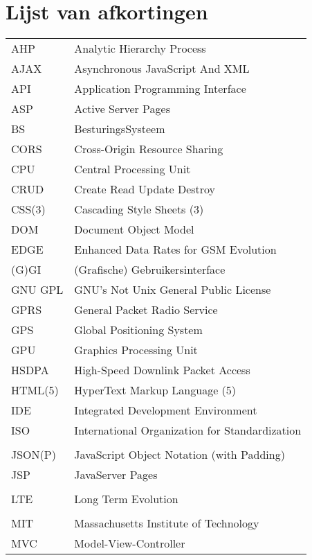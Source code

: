 \documentclass[master=cws,dutch,masteroption={vs,gs},inputenc=utf8]{kulemt}
\begin{document}
\chapter{Lijst van afkortingen}
\begin{flushleft}
  \renewcommand{\arraystretch}{1.1}
  \begin{longtable}{p{2cm} l}
     AHP & Analytic Hierarchy Process \\
     AJAX & Asynchronous JavaScript And XML \\
     API & Application Programming Interface \\
     ASP & Active Server Pages \\
     BS & BesturingsSysteem \\
     CORS & Cross-Origin Resource Sharing \\
     CPU & Central Processing Unit \\
     CRUD & Create Read Update Destroy \\
     CSS(3) & Cascading Style Sheets (3) \\
     DOM & Document Object Model \\
     EDGE & Enhanced Data Rates for GSM Evolution \\
     (G)GI & (Grafische) Gebruikersinterface \\
     GNU GPL & GNU's Not Unix General Public License \\
     GPRS & General Packet Radio Service \\
     GPS & Global Positioning System \\
     GPU & Graphics Processing Unit \\
     HSDPA & High-Speed Downlink Packet Access \\
     HTML(5) & HyperText Markup Language (5) \\
     IDE & Integrated Development Environment \\
     ISO & International Organization for Standardization \\
     \jqma{} & \jqm{} \\
     JSON(P)  & JavaScript Object Notation (with Padding) \\
     JSP & JavaServer Pages \\
     \kendoa{} & \kendo{} \\
     LTE & Long Term Evolution \\
     \lungoa{} & \lungo{} \\
     MIT & Massachusetts Institute of Technology \\
     MVC & Model-View-Controller \\

\end{longtable}
\end{flushleft}
\end{document}
